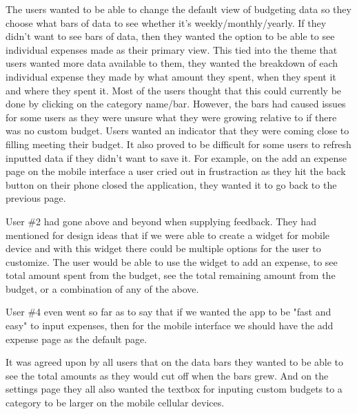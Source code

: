 \documentclass{chi2011}
\begin{document}
	The users wanted to be able to change the default view of budgeting data so they choose
	what bars of data to see whether it's weekly/monthly/yearly. If they didn't want to see bars of
	data, then they wanted the option to be able to see individual expenses made as their primary 
	view. This tied into the theme that users wanted more data available to them, they wanted the
	breakdown of each individual expense they made by what amount they spent, when they spent it 
	and where they spent it. Most of the users thought that this could currently be done by 
	clicking on the category name/bar. However, the bars had caused issues for some users as they 
	were unsure what they were growing relative to if there was no custom budget. Users wanted an 
	indicator that they were coming close to filling meeting their budget. It also proved to be 
	difficult for some users to refresh inputted data if they didn't want to save it. For example,
	on the add an expense page on the mobile interface a user cried out in frustraction as they hit
	the back button on their phone closed the application, they wanted it to go back to the 
	previous page. 
	
	User \#2 had gone above and beyond when supplying feedback. They had mentioned for 
	design ideas that if we were able to create a widget for mobile device and with this widget
	there could be multiple options for the user to customize. The user would be able to use the 
	widget to add an expense, to see total amount spent from the budget, see the total remaining 
	amount from the budget, or a combination of any of the above. 
	
	User \#4 even went so far as to say that if we wanted the app to be "fast and easy" to input
	expenses, then for the mobile interface we should have the add expense page as the default
	page. 
	
	It was agreed upon by all users that on the data bars they wanted to be able to see the total
	amounts as they would cut off when the bars grew. And on the settings page they all also wanted
	the textbox for inputing custom budgets to a category to be larger on the mobile cellular 
	devices.
\end{document}
